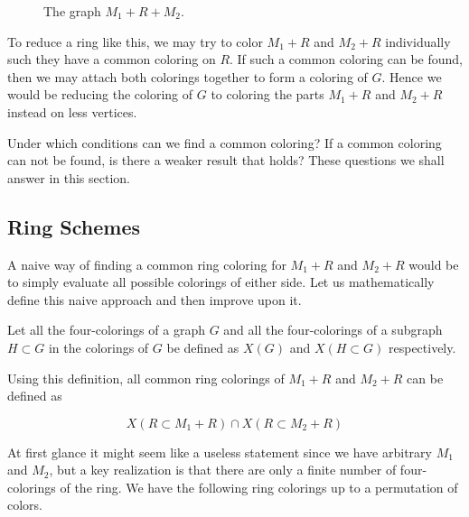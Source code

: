 \begin{figure}[!ht]
    \centering
    \caption{The graph $M_1 + R + M_2$.}
\end{figure}

To reduce a ring like this, we may try to color $M_1+R$ and $M_2+R$ individually such they have a common coloring on $R$. If such a common coloring can be found, then we may attach both colorings together to form a coloring of $G$. Hence we would be reducing the coloring of $G$ to coloring the parts $M_1+R$ and $M_2+R$ instead on less vertices.

Under which conditions can we find a common coloring? If a common coloring can not be found, is there a weaker result that holds? These questions we shall answer in this section.

\subsection{Ring Schemes}

A naive way of finding a common ring coloring for $M_1+R$ and $M_2+R$ would be to simply evaluate all possible colorings of either side. Let us mathematically define this naive approach and then improve upon it.

\begin{definition}
    Let all the four-colorings of a graph $G$ and all the four-colorings of a subgraph $H \subset G$ in the colorings of $G$ be defined as $X(G)$ and $X(H\subset G)$ respectively.
\end{definition}

Using this definition, all common ring colorings of $M_1+R$ and $M_2+R$ can be defined as

\begin{equation}
    X(R \subset M_1+R) \cap X(R \subset M_2+R)
\end{equation}

At first glance it might seem like a useless statement since we have arbitrary $M_1$ and $M_2$, but a key realization is that there are only a finite number of four-colorings of the ring. We have the following ring colorings up to a permutation of colors.

